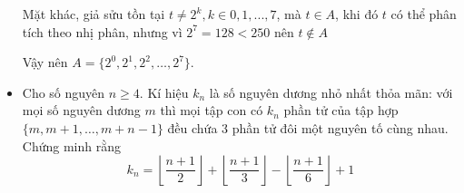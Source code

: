 \documentclass[11pt]{scrartcl}
\begin{document}
\begin{itemize}[label=, leftmargin=0em, itemsep=0.5em]
\begin{sol}
        Mặt khác, giả sửu tồn tại $t \neq 2^k, k \in 0,1,...,7$, mà $t \in A$, khi đó $t$ có thể phân tích theo nhị phân, nhưng vì $2^7 = 128 < 250$ nên $t \notin A$
         
        Vậy nên  $A = \{2^0,2^1,2^2,\dots,2^7\}$.
    \end{sol}
    \item \begin{btvn}
        Cho số nguyên $n \geq 4$. Kí hiệu $k_n$ là số nguyên dương nhỏ nhất thỏa mãn: với mọi số nguyên dương $m$ thì mọi tập con có $k_n$ phần tử của tập hợp $\{m, m + 1, \dots, m + n - 1\}$ đều chứa 3 phần tử đôi một nguyên tố cùng nhau. Chứng minh rằng
        \[
            k_n = \left\lfloor \frac{n + 1}{2}\right\rfloor + \left\lfloor \frac{n + 1}{3}\right\rfloor - \left\lfloor \frac{n + 1}{6}\right\rfloor + 1
        \]
    \end{btvn}


\end{itemize}
\end{document}
